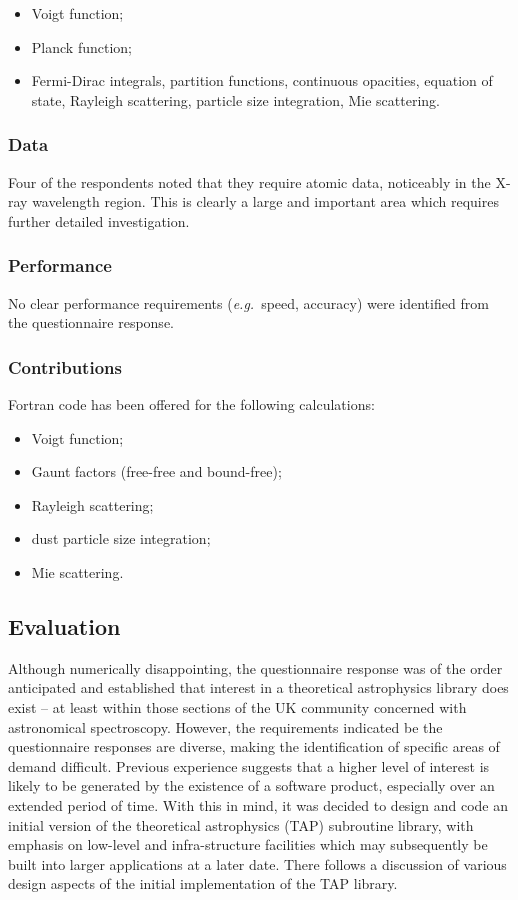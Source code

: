 \begin {itemize}
\item Voigt function;
\item Planck function;
\item Fermi-Dirac integrals, partition functions, continuous opacities,
equation of state, Rayleigh scattering, particle size integration, Mie
scattering.
\end {itemize}


\subsubsection {Data}
Four of the respondents noted that they require atomic data, noticeably in
the X-ray wavelength region.
This is clearly a large and important area which requires further
detailed investigation.

\subsubsection {Performance}
No clear performance requirements ({\em e.g.}\ speed, accuracy) were
identified from the questionnaire response.

\subsubsection {Contributions}
Fortran code has been offered for the following calculations:

\begin {itemize}
\item Voigt function;
\item Gaunt factors (free-free and bound-free);
\item Rayleigh scattering;
\item dust particle size integration;
\item Mie scattering.
\end {itemize}

\subsection {Evaluation}

Although numerically disappointing, the questionnaire response was of the order
anticipated and established that interest in a theoretical astrophysics 
library does exist -- at least within those sections of the UK community 
concerned with astronomical spectroscopy.
However, the requirements indicated be the questionnaire responses
are diverse, making the identification of specific areas of demand difficult.
Previous experience suggests that a higher level of interest is likely to be 
generated by the existence of a software product, especially over an extended 
period of time. 
With this in mind, it was decided to design and code an initial version of 
the theoretical astrophysics (TAP) subroutine library, with emphasis on 
low-level and infra-structure facilities which may subsequently be built 
into larger applications at a later date.
There follows a discussion of various design aspects of the initial 
implementation of the TAP library.

